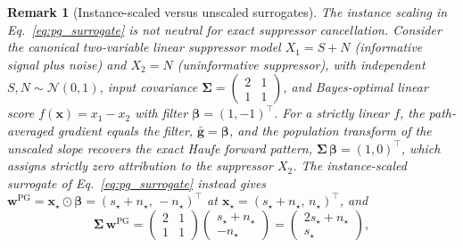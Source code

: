\documentclass[pdflatex,sn-mathphys-num]{sn-jnl}
\theoremstyle{thmstyleone}
\theoremstyle{thmstyletwo}%
\newtheorem{remark}{Remark}%
\theoremstyle{thmstylethree}%
\begin{document}
\begin{remark}[Instance-scaled versus unscaled surrogates]\label{rem:scaling}
The instance scaling in Eq.~\eqref{eq:pg_surrogate} is not neutral for exact suppressor cancellation. Consider the canonical two-variable linear suppressor model $X_1 = S + N$ (informative signal plus noise) and $X_2 = N$ (uninformative suppressor), with independent $S, N \sim \mathcal{N}(0,1)$, input covariance $\boldsymbol{\Sigma} = \left(\begin{smallmatrix} 2 & 1 \\ 1 & 1 \end{smallmatrix}\right)$, and Bayes-optimal linear score $f(\mathbf{x}) = x_1 - x_2$ with filter $\boldsymbol{\beta} = (1, -1)^\top$. For a strictly linear $f$, the path-averaged gradient equals the filter, $\bar{\mathbf{g}} = \boldsymbol{\beta}$, and the population transform of the \emph{unscaled slope} recovers the exact Haufe forward pattern, $\boldsymbol{\Sigma}\,\boldsymbol{\beta} = (1, 0)^\top$, which assigns strictly zero attribution to the suppressor $X_2$. The instance-scaled surrogate of Eq.~\eqref{eq:pg_surrogate} instead gives $\mathbf{w}^{\text{PG}} = \mathbf{x}_\star \odot \boldsymbol{\beta} = (s_\star + n_\star,\, -n_\star)^\top$ at $\mathbf{x}_\star = (s_\star + n_\star,\, n_\star)^\top$, and
\begin{equation*}
    \boldsymbol{\Sigma}\,\mathbf{w}^{\text{PG}} = \left(\begin{smallmatrix} 2 & 1 \\ 1 & 1 \end{smallmatrix}\right) \left(\begin{smallmatrix} s_\star + n_\star \\ -n_\star \end{smallmatrix}\right) = \left(\begin{smallmatrix} 2 s_\star + n_\star \\ s_\star \end{smallmatrix}\right),
\end{equation*}

\end{remark}
\end{document}
